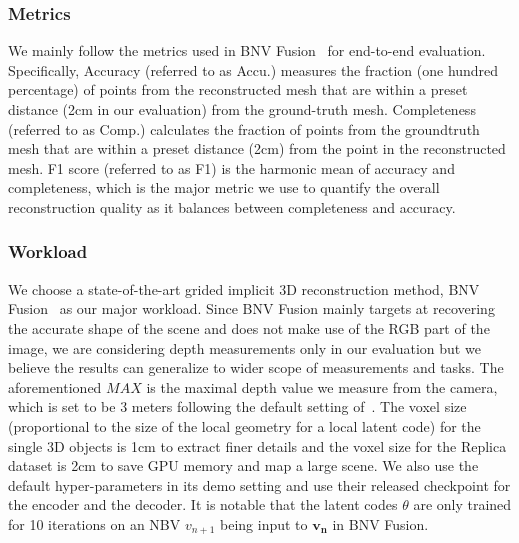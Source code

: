\subsubsection{Metrics}
We mainly follow the metrics used in BNV Fusion~\cite{li_bnv-fusion_2022} for end-to-end evaluation.
Specifically, Accuracy (referred to as Accu.) measures the fraction (one hundred percentage) of points from the reconstructed mesh that are within a preset distance (2cm in our evaluation) from the ground-truth mesh.
Completeness (referred to as Comp.) calculates the fraction of points from the groundtruth mesh that are within a preset distance (2cm) from the point in the reconstructed mesh.
F1 score (referred to as F1) is the harmonic mean of accuracy and completeness, which is the major metric we use to quantify the overall reconstruction quality as it balances between completeness and accuracy.

\subsubsection{Workload}
We choose a state-of-the-art grided implicit 3D reconstruction method, BNV Fusion~\cite{li_bnv-fusion_2022} as our major workload.
Since BNV Fusion mainly targets at recovering the accurate shape of the scene and does not make use of the RGB part of the image, we are considering depth measurements only in our evaluation but we believe the results can generalize to wider scope of measurements and tasks.
The aforementioned $MAX$ is the maximal depth value we measure from the camera, which is set to be 3 meters following the default setting of~\cite{li_bnv-fusion_2022}.
The voxel size (proportional to the size of the local geometry for a local latent code) for the single 3D objects is 1cm to extract finer details and the voxel size for the Replica dataset is 2cm to save GPU memory and map a large scene.
We also use the default hyper-parameters in its demo setting and use their released checkpoint for the encoder and the decoder.
It is notable that the latent codes $\theta$ are only trained for 10 iterations on an NBV $v_{n+1}$ being input to $\bm{v_n}$ in BNV Fusion.

